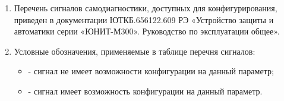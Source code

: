 \areaset{267mm}{180mm}
\fancyheadoffset{0pt} %


\begin{landscape}

\setlength{\footskip}{15.5pt}

\color{black}

\begin{enumerate}[label=\ref{app:signals}.\arabic*] %
  \item Перечень сигналов самодиагностики, доступных для конфигурирования, приведен в документации ЮТКБ.656122.609 РЭ «Устройство защиты и автоматики серии «ЮНИТ-М300». Руководство по эксплуатации общее».
  \item Условные обозначения, применяемые в таблице перечня сигналов:
  \begin{itemize}
    \item[$\text{(--)}$] { - сигнал не имеет возможности конфигурации на данный параметр;}
    \item[$\text{(+)}$] { - сигнал имеет возможность конфигурации на данный параметр.}
  \end{itemize}
\end{enumerate}

\small %
\begin{longtable}{
>{\centering\arraybackslash}m{6.0cm}
|>{\centering\arraybackslash}m{3.45cm}
|>{\centering\arraybackslash}m{2cm}
|>{\centering\arraybackslash}m{2cm}
|>{\centering\arraybackslash}m{2cm}
|>{\centering\arraybackslash}m{2cm}
|>{\centering\arraybackslash}m{2cm}
|>{\centering\arraybackslash}m{2cm}
|>{\centering\arraybackslash}m{2.107cm}
}


\end{longtable}
\end{landscape}
